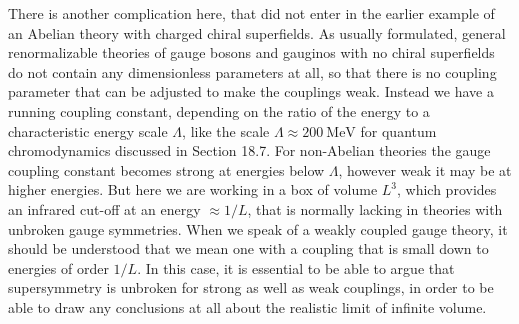 There is another complication here, that did not enter in the earlier
example of an Abelian theory with charged chiral superfields. As usually
formulated, general renormalizable theories of gauge bosons and gauginos
with no chiral superfields do not contain any dimensionless parameters at
all, so that there is no coupling parameter that can be adjusted to make the
couplings weak. Instead we have a running coupling constant, depending on
the ratio of the energy to a characteristic energy scale \(\Lambda\), like
the scale \(\Lambda\approx200\ \mathrm{MeV}\) for quantum chromodynamics
discussed in Section 18.7. For non-Abelian theories the gauge coupling
constant becomes strong at energies below \(\Lambda\), however weak it may
be at higher energies. But here we are working in a box of volume \(L^3\),
which provides an infrared cut-off at an energy \(\approx1/L\), that is
normally lacking in theories with unbroken gauge symmetries. When we speak
of a weakly coupled gauge theory, it should be understood that we mean one
with a coupling that is small down to energies of order \(1/L\). In this
case, it is essential to be able to argue that supersymmetry is unbroken for
strong as well as weak couplings, in order to be able to draw any
conclusions at all about the realistic limit of infinite volume.

